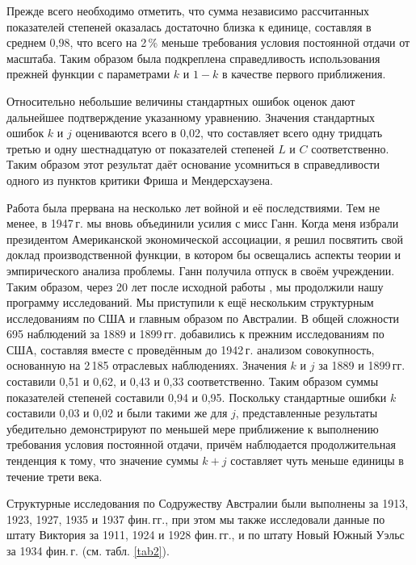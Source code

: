 \documentclass{article}
\begin{document}
Прежде всего необходимо отметить, что сумма независимо рассчитанных показателей степеней оказалась достаточно близка к единице, составляя в среднем 0,98, что всего на 2\,\% меньше требования условия постоянной отдачи от масштаба. Таким образом была подкреплена справедливость использования прежней функции с параметрами \(k\) и \(1-k\) в качестве первого приближения.

Относительно небольшие величины стандартных ошибок оценок дают дальнейшее подтверждение указанному уравнению. Значения стандартных ошибок \(k\) и \(j\) оцениваются всего в 0,02, что составляет всего одну тридцать третью и одну шестнадцатую от показателей степеней \(L\) и \(C\) соответственно. Таким образом этот результат даёт основание усомниться в справедливости одного из пунктов критики Фриша и Мендерсхаузена.

Работа была прервана на несколько лет войной и её последствиями. Тем не менее, в 1947\,г. мы вновь объединили усилия с мисс Ганн. Когда меня избрали президентом Американской экономической ассоциации, я решил посвятить свой доклад производственной функции, в котором бы освещались аспекты теории и эмпирического анализа проблемы. Ганн получила отпуск в своём учреждении. Таким образом, через 20 лет после исходной работы \cite{Douglas:1}, мы продолжили нашу программу исследований. Мы приступили к ещё нескольким структурным исследованиям по США и главным образом по Австралии. В общей сложности 695 наблюдений за 1889 и 1899\,гг. добавились к прежним исследованиям по США, составляя вместе с проведённым до 1942\,г. анализом совокупность, основанную на 2\,185 отраслевых наблюдениях. Значения \(k\) и \(j\) за 1889 и 1899\,гг. составили 0,51 и 0,62, и 0,43 и 0,33 соответственно. Таким образом суммы показателей степеней составили 0,94 и 0,95. Поскольку стандартные ошибки \(k\) составили 0,03 и 0,02 и были такими же для \(j\), представленные результаты убедительно демонстрируют по меньшей мере приближение к выполнению требования условия постоянной отдачи, %
причём наблюдается продолжительная тенденция к тому, что значение суммы \(k + j\) составляет чуть меньше единицы в течение трети века.

Структурные исследования по Содружеству Австралии были выполнены за 1913, 1923, 1927, 1935 и 1937 фин.\,гг., при этом мы также исследовали данные по штату Виктория за 1911, 1924 и 1928 фин.\,гг., и по штату Новый Южный Уэльс за 1934 фин.\,г. (см. табл. \ref{tab2}).
\end{document}
